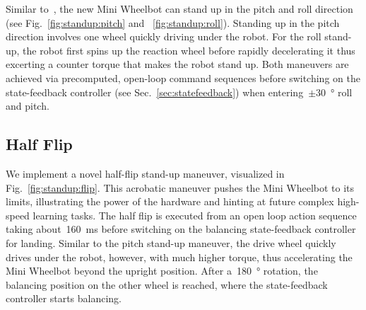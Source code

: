 \label{sec:standup}
Similar to~\cite{geist2022wheelbot}, the new Mini Wheelbot can stand up in the pitch and roll direction (see Fig.~\ref{fig:standup:pitch} and ~\ref{fig:standup:roll}).
Standing up in the pitch direction involves one wheel quickly driving under the robot.
For the roll stand-up, the robot first spins up the reaction wheel before rapidly decelerating it thus excerting a counter torque that makes the robot stand up.
Both maneuvers are achieved via precomputed, open-loop command sequences before switching on the state-feedback controller (see Sec.~\ref{sec:statefeedback}) when entering~$\pm$\SI{30}{\degree} roll and pitch.

\subsection{Half Flip}
\label{sec:flip}
We implement a novel half-flip stand-up maneuver, visualized in Fig.~\ref{fig:standup:flip}.
This acrobatic maneuver pushes the Mini Wheelbot to its limits, illustrating the power of the hardware and hinting at future complex high-speed learning tasks.
The half flip is executed from an open loop action sequence taking about~\SI{160}{\milli\second} before switching on the balancing state-feedback controller for landing.
Similar to the pitch stand-up maneuver, the drive wheel quickly drives under the robot, however, with much higher torque, thus accelerating the Mini Wheelbot beyond the upright position.
After a~\SI{180}{\degree} rotation, the balancing position on the other wheel is reached, where the state-feedback controller starts balancing.
